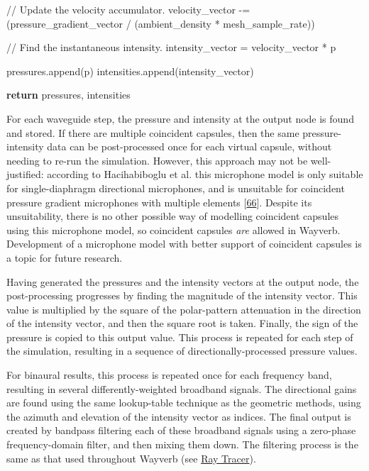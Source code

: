 \documentclass[]{scrreprt}
\newenvironment{Shaded}{}{}
\newcommand{\ControlFlowTok}[1]{\textcolor[rgb]{0.00,0.44,0.13}{\textbf{{#1}}}}
\newcommand{\OperatorTok}[1]{\textcolor[rgb]{0.40,0.40,0.40}{{#1}}}
\newcommand{\NormalTok}[1]{{#1}}
\begin{document}
\begin{Shaded}
\begin{Highlighting}[]
        \OperatorTok{//}  \NormalTok{Update the velocity accumulator.}
        \NormalTok{velocity_vector }\OperatorTok{-=} \NormalTok{(pressure_gradient_vector }\OperatorTok{/}
                            \NormalTok{(ambient_density }\OperatorTok{*} \NormalTok{mesh_sample_rate))}

        \OperatorTok{//}  \NormalTok{Find the instantaneous intensity.}
        \NormalTok{intensity_vector }\OperatorTok{=} \NormalTok{velocity_vector }\OperatorTok{*} \NormalTok{p}

        \NormalTok{pressures.append(p)}
        \NormalTok{intensities.append(intensity_vector)}

    \ControlFlowTok{return} \NormalTok{pressures, intensities}
\end{Highlighting}
\end{Shaded}

For each waveguide step, the pressure and intensity at the output node
is found and stored. If there are multiple coincident capsules, then the
same pressure-intensity data can be post-processed once for each virtual
capsule, without needing to re-run the simulation. However, this
approach may not be well-justified: according to Hacihabiboglu et al.
this microphone model is only suitable for single-diaphragm directional
microphones, and is unsuitable for coincident pressure gradient
microphones with multiple elements
{[}\protect\hyperlink{ref-hacihabibogluux5fsimulationux5f2010}{66}{]}.
Despite its unsuitability, there is no other possible way of modelling
coincident capsules using this microphone model, so coincident capsules
\emph{are} allowed in Wayverb. Development of a microphone model with
better support of coincident capsules is a topic for future research.

Having generated the pressures and the intensity vectors at the output
node, the post-processing progresses by finding the magnitude of the
intensity vector. This value is multiplied by the square of the
polar-pattern attenuation in the direction of the intensity vector, and
then the square root is taken. Finally, the sign of the pressure is
copied to this output value. This process is repeated for each step of
the simulation, resulting in a sequence of directionally-processed
pressure values.

For binaural results, this process is repeated once for each frequency
band, resulting in several differently-weighted broadband signals. The
directional gains are found using the same lookup-table technique as the
geometric methods, using the azimuth and elevation of the intensity
vector as indices. The final output is created by bandpass filtering
each of these broadband signals using a zero-phase frequency-domain
filter, and then mixing them down. The filtering process is the same as
that used throughout Wayverb (see
\href{\%7B\%7B\%20site.baseurl\%20\%7D\%7D\%7B\%\%20link\%20ray_tracer.md\%20\%\%7D}{Ray
Tracer}).
\end{document}
